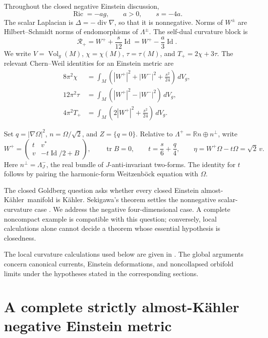 \documentclass[11pt,a4paper]{article}
\theoremstyle{definition}
\theoremstyle{remark}
\newcommand{\Ric}{\operatorname{Ric}}
\newcommand{\tr}{\operatorname{tr}}
\newcommand{\Vol}{\operatorname{Vol}}
\newcommand{\Id}{\operatorname{Id}}
\newcommand{\dd}{\,dV_g}
\newcommand{\R}{\mathbb R}
\newcommand{\cR}{\mathcal R}
\newcommand{\AK}{almost-K\"ahler}
\begin{document}
Throughout the closed negative Einstein discussion,
\begin{equation}\label{eq:einstein}
 \Ric=-ag,\qquad a>0,\qquad s=-4a.
\end{equation}
The scalar Laplacian is $\Delta=-\operatorname{div}\nabla$, so that it is nonnegative. Norms of $W^\pm$ are Hilbert--Schmidt norms of endomorphisms of $\Lambda^\pm$. The self-dual curvature block is
\[
 \cR_+=W^++\frac{s}{12}\Id=W^+-\frac a3\Id.
\]
We write $V=\Vol_g(M)$, $\chi=\chi(M)$, $\tau=\tau(M)$, and $T_+=2\chi+3\tau$. The relevant Chern--Weil identities for an Einstein metric are
\begin{align}
 8\pi^2\chi&=\int_M\left(|W^+|^2+|W^-|^2+\frac{s^2}{24}\right)\dd,\label{eq:gb}\\
 12\pi^2\tau&=\int_M\left(|W^+|^2-|W^-|^2\right)\dd,\label{eq:signature}\\
 4\pi^2T_+&=\int_M\left(2|W^+|^2+\frac{s^2}{24}\right)\dd.\label{eq:chern}
\end{align}

Set $q=|\nabla\Omega|^2$, $n=\Omega/\sqrt2$, and $Z=\{q=0\}$. Relative to $\Lambda^+=\R n\oplus n^\perp$, write
\begin{equation}\label{eq:block}
 W^+=\begin{pmatrix}t&v^*\\v&-t\Id/2+B\end{pmatrix},\qquad
 \tr B=0,\qquad
 t=\frac s6+\frac q4,\qquad
 \eta=W^+\Omega-t\Omega=\sqrt2\,v.
\end{equation}
Here $n^\perp=\Lambda_J^-$, the real bundle of $J$-anti-invariant two-forms. The identity for $t$ follows by pairing the harmonic-form Weitzenb\"ock equation with $\Omega$.

The closed Goldberg question asks whether every closed Einstein \AK\ manifold is K\"ahler. Sekigawa's theorem settles the nonnegative scalar-curvature case \cite{Sekigawa}. We address the negative four-dimensional case. A complete noncompact example is compatible with this question; conversely, local calculations alone cannot decide a theorem whose essential hypothesis is closedness.

The local curvature calculations used below are given in \cite{Repository,CompleteSource,ZeroSource,ZeroCurves}. The global arguments concern canonical currents, Einstein deformations, and noncollapsed orbifold limits under the hypotheses stated in the corresponding sections.

\section{A complete strictly almost-K\"ahler negative Einstein metric}
\end{document}

